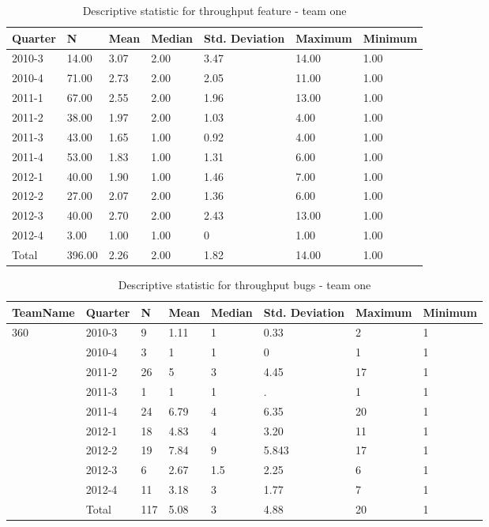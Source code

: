 \documentclass[UKenglish]{ifimaster}  %
\begin{document}
\begin{table}[!htbp]
\begin{tabular}{ | l | l | l | l | l | l | l | }
\hline
	Quarter & N & Mean & Median & Std. Deviation & Maximum & Minimum \\ \hline
	2010-3 & 14.00 & 3.07 & 2.00 & 3.47 & 14.00 & 1.00\\ \hline
	2010-4 & 71.00 & 2.73 & 2.00 & 2.05 & 11.00 & 1.00\\ \hline
	2011-1 & 67.00 & 2.55 & 2.00 & 1.96 & 13.00 & 1.00\\ \hline
	2011-2 & 38.00 & 1.97 & 2.00 & 1.03 & 4.00 & 1.00\\ \hline
	2011-3 & 43.00 & 1.65 & 1.00 & 0.92 & 4.00 & 1.00\\ \hline
	2011-4 & 53.00 & 1.83 & 1.00 & 1.31 & 6.00 & 1.00\\ \hline
	2012-1 & 40.00 & 1.90 & 1.00 & 1.46 & 7.00 & 1.00\\ \hline
	2012-2 & 27.00 & 2.07 & 2.00 & 1.36 & 6.00 & 1.00\\ \hline
	2012-3 & 40.00 & 2.70 & 2.00 & 2.43 & 13.00 & 1.00\\ \hline
	2012-4 & 3.00 & 1.00 & 1.00 & 0 & 1.00 & 1.00\\ \hline
	Total & 396.00 & 2.26 & 2.00 & 1.82 & 14.00 & 1.00\\ \hline
	 \end{tabular}
\caption{Descriptive statistic for throughput feature - team one }%
\end{table}	 

\begin{table}[!htbp]	 
\begin{tabular}{ | l | l | l | l | l | l | l | l | }
\hline
	TeamName & Quarter & N & Mean & Median & Std. Deviation & Maximum & Minimum \\ \hline
	360 & 2010-3 & 9 & 1.11 & 1 & 0.33& 2 & 1 \\ \hline
	 & 2010-4 & 3 & 1 & 1 & 0 & 1 & 1 \\ \hline
	 & 2011-2 & 26 & 5 & 3 & 4.45 & 17 & 1 \\ \hline
	 & 2011-3 & 1 & 1 & 1 & . & 1 & 1 \\ \hline
	 & 2011-4 & 24 & 6.79 & 4 & 6.35 & 20 & 1 \\ \hline
	 & 2012-1 & 18 & 4.83 & 4 & 3.20 & 11 & 1 \\ \hline
	 & 2012-2 & 19 & 7.84 & 9 & 5.843 & 17 & 1 \\ \hline
	 & 2012-3 & 6 & 2.67 & 1.5 & 2.25 & 6 & 1 \\ \hline
	 & 2012-4 & 11 & 3.18 & 3 & 1.77 & 7 & 1 \\ \hline
	 & Total & 117 & 5.08 & 3 & 4.88 & 20 & 1 \\ \hline
	 \end{tabular}
\caption{Descriptive statistic for throughput bugs - team one }%
\end{table}  
\end{document}
